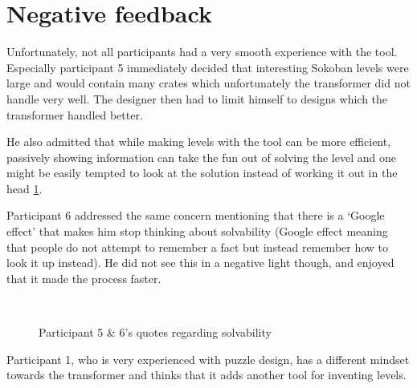 \section{Negative feedback}

Unfortunately, not all participants had a very smooth experience with the tool. Especially participant 5 immediately decided that interesting Sokoban levels were large and would contain many crates which unfortunately the transformer did not handle very well. The designer then had to limit himself to designs which the transformer handled better.

He also admitted that while making levels with the tool can be more efficient, passively showing information can take the fun out of solving the level and one might be easily tempted to look at the solution instead of working it out in the head \ref{fig:part5comments}.

Participant 6 addressed the same concern mentioning that there is a `Google effect' that makes him stop thinking about solvability (Google effect meaning that people do not attempt to remember a fact but instead remember how to look it up instead). He did not see this in a negative light though, and enjoyed that it made the process faster.

\begin{figure}[!htb]
\begin{minipage}[t]{\textwidth}
\textit{} \hfill \\

\textit{}

\textit{}

\end{minipage}
\caption{Participant 5 \& 6's quotes regarding solvability\label{fig:part5comments}}
\end{figure}



Participant 1, who is very experienced with puzzle design, has a different mindset towards the transformer and thinks that it adds another tool for inventing levels.

